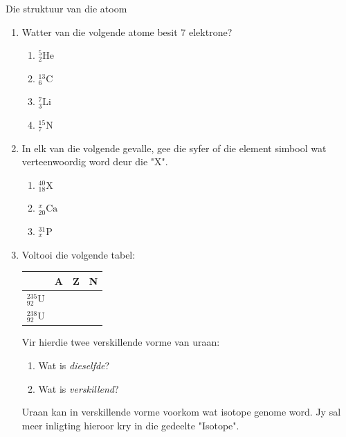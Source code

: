 \begin{exercises}{Die struktuur van die atoom}
\begin{enumerate}[noitemsep, label=\textbf{\arabic*}. ]
\begin{enumerate}[noitemsep, label=\textbf{\alph*}. ]
            \item protone
\item neutrone
\item elektrone
\end{enumerate}
... in die atoom.\newline
\item Watter van die volgende atome besit 7 elektrone?
\begin{enumerate}[noitemsep, label=\textbf{\alph*}. ] 
            \item $_{2}^{5}\text{He}$
\item $_{6}^{13}\text{C}$
\item $_{3}^{7}\text{Li}$
\item $_{7}^{15}\text{N}$
\end{enumerate}
                \item 
In elk van die volgende gevalle, gee die syfer of die element simbool wat verteenwoordig word deur die "X".
\begin{enumerate}[noitemsep, label=\textbf{\alph*}. ] 
            \item $_{18}^{40}\text{X}$
\item $_{20}^{x}\text{Ca}$
\item $_{x}^{31}\text{P}$
\end{enumerate}
                \item 
Voltooi die volgende tabel:
          \begin{table}[H]
        \begin{center}
      
    \noindent
      \begin{tabular}{|l|l|l|l|}\hline
         &
        \textbf{A} &
        \textbf{Z} &
        \textbf{N} \\ \hline
        $_{92}^{235}\text{U}$ &
         &
         &
        \\ \hline
        $_{92}^{238}\text{U}$ &
         &
         &
     \\ \hline
    \end{tabular}
      \end{center}
\end{table}
    \par
Vir hierdie twee verskillende vorme van uraan:
\begin{enumerate}[noitemsep, label=\textbf{\alph*}. ] 
            \item Wat is \textsl{dieselfde}?
\item Wat is \textsl{verskillend}?
\end{enumerate}
Uraan kan in verskillende vorme voorkom wat isotope genome word. Jy sal meer inligting hieroor kry in die gedeelte "Isotope".
\end{enumerate}
  

\end{exercises}

